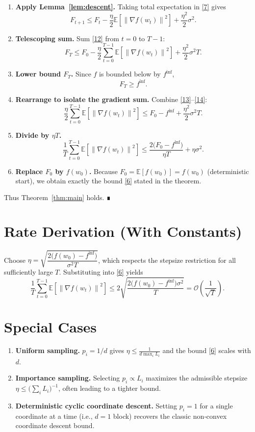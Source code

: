 \documentclass{article}
\newcommand{\E}{\mathbb{E}}
\newcommand{\norm}[1]{\left\lVert#1\right\rVert}
\begin{document}
\begin{enumerate}[label=[Step \arabic*], leftmargin=*]
\item \textbf{Apply Lemma~\ref{lem:descent}.}  
Taking total expectation in \eqref{7} gives
\[
F_{t+1}\le F_t-\frac{\eta}{2}\E\!\left[\norm{\nabla f(w_t)}^{2}\right]+\frac{\eta^{2}}{2}\sigma^{2}.
\tag{12}
\]

\item \textbf{Telescoping sum.}  
Sum \eqref{12} from $t=0$ to $T-1$:
\[
F_T\le F_0-\frac{\eta}{2}\sum_{t=0}^{T-1}\E\!\left[\norm{\nabla f(w_t)}^{2}\right]
+\frac{\eta^{2}}{2}\sigma^{2}T.
\tag{13}
\]

\item \textbf{Lower bound $F_T$.}  
Since $f$ is bounded below by $f^{\inf}$,
\[
F_T\ge f^{\inf}.
\tag{14}
\]

\item \textbf{Rearrange to isolate the gradient sum.}  
Combine \eqref{13}–\eqref{14}:
\[
\frac{\eta}{2}\sum_{t=0}^{T-1}\E\!\left[\norm{\nabla f(w_t)}^{2}\right]
\le F_0-f^{\inf}+\frac{\eta^{2}}{2}\sigma^{2}T.
\tag{15}
\]

\item \textbf{Divide by $\eta T$.}  
\[
\frac{1}{T}\sum_{t=0}^{T-1}\E\!\left[\norm{\nabla f(w_t)}^{2}\right]
\le \frac{2\bigl(F_0-f^{\inf}\bigr)}{\eta T}+ \eta\sigma^{2}.
\tag{16}
\]

\item \textbf{Replace $F_0$ by $f(w_0)$.}  
Because $F_0=\E[f(w_0)]=f(w_0)$ (deterministic start), we obtain exactly the bound \eqref{6} stated in the theorem.
\end{enumerate}
Thus Theorem~\ref{thm:main} holds. ∎

\section*{Rate Derivation (With Constants)}
Choose $\eta = \sqrt{\dfrac{2\bigl(f(w_0)-f^{\inf}\bigr)}{\sigma^{2}T}}$, which respects the stepsize restriction for all sufficiently large $T$. Substituting into \eqref{6} yields
\[
\frac{1}{T}\sum_{t=0}^{T-1}\E\!\left[\norm{\nabla f(w_t)}^{2}\right]
\le 2\sqrt{\frac{2\bigl(f(w_0)-f^{\inf}\bigr)\sigma^{2}}{T}}
= \mathcal{O}\!\left(\frac{1}{\sqrt{T}}\right).
\tag{17}
\]

\section*{Special Cases}
\begin{enumerate}[label=\alph*)]
\item \textbf{Uniform sampling.} $p_i = 1/d$ gives $\eta\le \frac{1}{d\max_i L_i}$ and the bound \eqref{6} scales with $d$.
\item \textbf{Importance sampling.} Selecting $p_i \propto L_i$ maximizes the admissible stepsize $\eta\le \bigl(\sum_i L_i\big)^{-1}$, often leading to a tighter bound.
\item \textbf{Deterministic cyclic coordinate descent.} Setting $p_i=1$ for a single coordinate at a time (i.e., $d=1$ block) recovers the classic non‑convex coordinate descent bound.
\end{enumerate}
\end{document}
